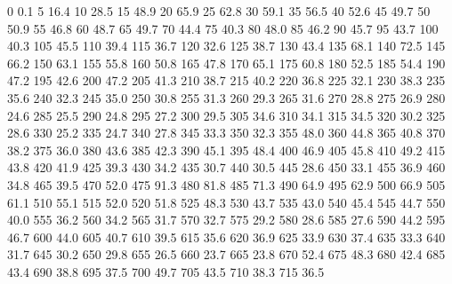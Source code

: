 0 0.1
5 16.4
10 28.5
15 48.9
20 65.9
25 62.8
30 59.1
35 56.5
40 52.6
45 49.7
50 50.9
55 46.8
60 48.7
65 49.7
70 44.4
75 40.3
80 48.0
85 46.2
90 45.7
95 43.7
100 40.3
105 45.5
110 39.4
115 36.7
120 32.6
125 38.7
130 43.4
135 68.1
140 72.5
145 66.2
150 63.1
155 55.8
160 50.8
165 47.8
170 65.1
175 60.8
180 52.5
185 54.4
190 47.2
195 42.6
200 47.2
205 41.3
210 38.7
215 40.2
220 36.8
225 32.1
230 38.3
235 35.6
240 32.3
245 35.0
250 30.8
255 31.3
260 29.3
265 31.6
270 28.8
275 26.9
280 24.6
285 25.5
290 24.8
295 27.2
300 29.5
305 34.6
310 34.1
315 34.5
320 30.2
325 28.6
330 25.2
335 24.7
340 27.8
345 33.3
350 32.3
355 48.0
360 44.8
365 40.8
370 38.2
375 36.0
380 43.6
385 42.3
390 45.1
395 48.4
400 46.9
405 45.8
410 49.2
415 43.8
420 41.9
425 39.3
430 34.2
435 30.7
440 30.5
445 28.6
450 33.1
455 36.9
460 34.8
465 39.5
470 52.0
475 91.3
480 81.8
485 71.3
490 64.9
495 62.9
500 66.9
505 61.1
510 55.1
515 52.0
520 51.8
525 48.3
530 43.7
535 43.0
540 45.4
545 44.7
550 40.0
555 36.2
560 34.2
565 31.7
570 32.7
575 29.2
580 28.6
585 27.6
590 44.2
595 46.7
600 44.0
605 40.7
610 39.5
615 35.6
620 36.9
625 33.9
630 37.4
635 33.3
640 31.7
645 30.2
650 29.8
655 26.5
660 23.7
665 23.8
670 52.4
675 48.3
680 42.4
685 43.4
690 38.8
695 37.5
700 49.7
705 43.5
710 38.3
715 36.5
